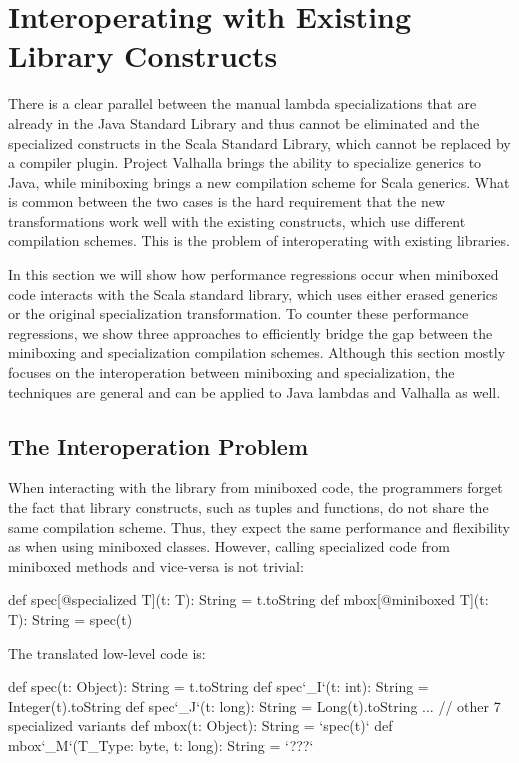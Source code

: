 \section{Interoperating with Existing Library Constructs}
\label{sec:library}

There is a clear parallel between the manual lambda specializations that are already in the Java Standard Library and thus cannot be eliminated and the specialized constructs in the Scala Standard Library, which cannot be replaced by a compiler plugin. Project Valhalla brings the ability to specialize generics to Java, while miniboxing brings a new compilation scheme for Scala generics. What is common between the two cases is the hard requirement that the new transformations work well with the existing constructs, which use different compilation schemes. This is the problem of interoperating with existing libraries.

In this section we will show how performance regressions occur when miniboxed code interacts with the Scala standard library, which uses either erased generics or the original specialization transformation. To counter these performance regressions, we show three approaches to efficiently bridge the gap between the miniboxing and specialization compilation schemes. Although this section mostly focuses on the interoperation between miniboxing and specialization, the techniques are general and can be applied to Java lambdas and Valhalla as well.

\subsection{The Interoperation Problem}

When interacting with the library from miniboxed code, the programmers forget the fact that library constructs, such as tuples and functions, do not share the same compilation scheme. Thus, they expect the same performance and flexibility as when using miniboxed classes. However, calling specialized code from miniboxed methods and vice-versa is not trivial:

\begin{lstlisting-nobreak}
 def spec[@specialized T](t: T): String = t.toString
 def mbox[@miniboxed T](t: T): String = spec(t)
\end{lstlisting-nobreak}

The translated low-level code is:

\begin{lstlisting-nobreak}
 def spec(t: Object): String = t.toString
 def spec`_I`(t: int): String = Integer(t).toString
 def spec`_J`(t: long): String = Long(t).toString
 ... // other 7 specialized variants
 def mbox(t: Object): String = `spec(t)`
 def mbox`_M`(T_Type: byte, t: long): String = `???`
\end{lstlisting-nobreak}

